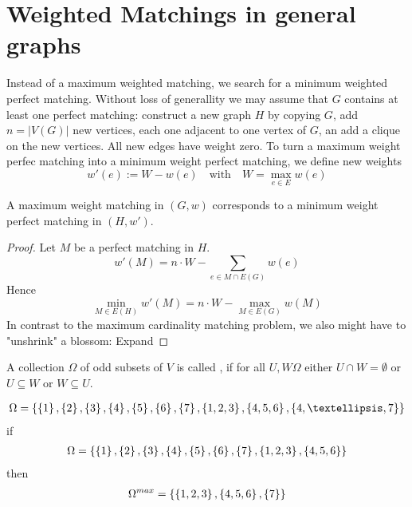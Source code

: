 \begin{lec}[2011-11-24]\end{lec}

\section*{Weighted Matchings in general graphs}
Instead of a maximum weighted matching, we search for a minimum weighted perfect matching. Without loss of generallity we may assume that $G$ contains at least one perfect matching: construct a new graph $H$ by copying $G$, add $n=|V(G)|$ new vertices, each one adjacent to one vertex of $G$, an add a clique on the new vertices. All new edges have weight zero. To turn a maximum weight perfec matching into a minimum weight perfect matching, we define new weights  \[w'(e):=W-w(e) \quad\text{with}\quad W = \max_{e\in E} w(e) \]
\begin{lem}
	A maximum weight matching in $(G,w)$ corresponds to a minimum weight perfect matching in $(H,w')$.
\end{lem}

\begin{proof}
	Let $M$ be a perfect matching in $H$.
	\[
		w'(M)= n \cdot W - \sum\limits_{e \in M \cap E(G)} w(e)
	\]
	Hence
	\[ 
		\min_{M \in E(H)} w'(M) = n \cdot W - \max_{M \in E(G)} w(M)
	\]
	In contrast to the maximum cardinality matching problem, we also might have to "unshrink" a blossom: Expand
\end{proof}

\begin{defn}
	 A collection $\Omega$ of odd subsets of $V$ is called , if for all $U,W \Omega$ either $U\cap W = \emptyset$ or $U \subseteq W$ or $W \subseteq U$.
\end{defn}

\begin{xmp+}
	\begin{align*}
		\Omega =  \plainset{\plainset{1}, \plainset{2}, \plainset{3}, \plainset{4}, \plainset{5}, \plainset{6}, \plainset{7}, \plainset{1,2,3}, \plainset{4,5,6}, \plainset{4, …, 7}}
	\end{align*}
	if
	\begin{align*}
		\Omega =  \left\{\left\{1\right\}, \left\{2\right\}, \left\{3\right\}, \left\{4\right\}, \left\{5\right\}, \left\{6\right\}, \left\{7\right\}, \left\{1,2,3\right\}, \left\{4,5,6\right\}\right\}
	\end{align*}
	then 
	\begin{align*}
		\Omega^{max} =  \left\{\left\{1,2,3\right\}, \left\{4,5,6\right\}, \left\{7\right\}\right\}
	\end{align*}
\end{xmp+}

